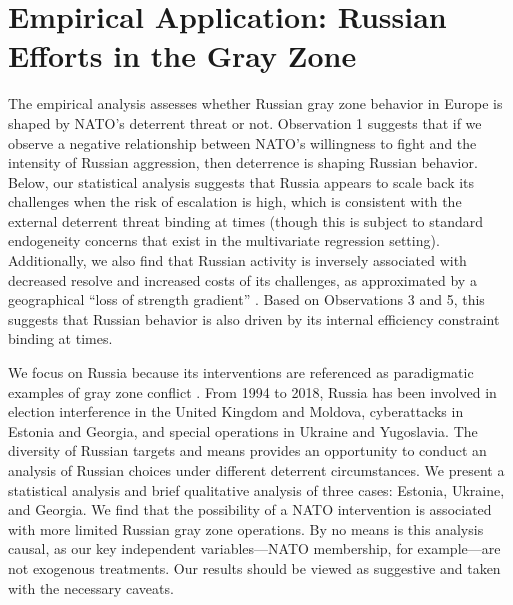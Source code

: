 \documentclass[11pt,letterpaper,pdftex,dvipsnames,table]{article}
\begin{document}
\section{Empirical Application: Russian Efforts in the Gray Zone} \label{empiricalanalysis}
The empirical analysis assesses whether Russian gray zone behavior in Europe is shaped by NATO's deterrent threat or not. Observation 1 suggests that if we observe a negative relationship between NATO's willingness to fight and the intensity of Russian aggression, then deterrence is shaping Russian behavior. Below, our statistical analysis suggests that Russia appears to scale back its challenges when the risk of escalation is high, which is consistent with the external deterrent threat binding at times (though this is subject to standard endogeneity concerns that exist in the multivariate regression setting). Additionally, we also find that Russian activity is inversely associated with decreased resolve and increased costs of its challenges, as approximated by a geographical ``loss of strength gradient'' \citep{posen_commandcommonsmilitary_2003}. Based on Observations 3 and 5, this suggests that Russian behavior is also driven by its internal efficiency constraint binding at times.

We focus on Russia because its interventions are referenced as paradigmatic examples of gray zone conflict \citep{marten_putinchoicesexplaining_2015, driscoll_friendsthesebrinkmanship_2016, jasper_russiancyberoperations_2020}. From 1994 to 2018, Russia has been involved in election interference in the United Kingdom and Moldova, cyberattacks in Estonia and Georgia, and special operations in Ukraine and Yugoslavia. The diversity of Russian targets and means provides an opportunity to conduct an analysis of Russian choices under different deterrent circumstances. We present a statistical analysis and brief qualitative analysis of three cases: Estonia, Ukraine, and Georgia. We find that the possibility of a NATO intervention is associated with more limited Russian gray zone operations. By no means is this analysis causal, as our key independent variables---NATO membership, for example---are not exogenous treatments. Our results should be viewed as suggestive and taken with the necessary caveats.
\end{document}
